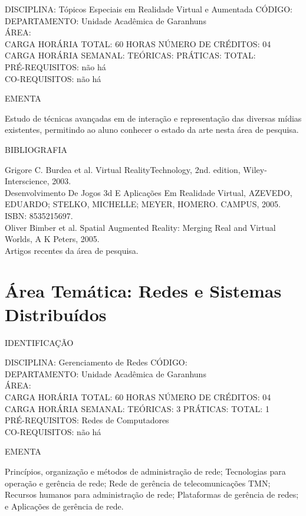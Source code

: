 \documentclass[
	12pt,				%
	openright,			%
  oneside,     %
	a4paper,			%
	english,			%
	french,				%
	spanish,			%
	brazil				%
	]{abntex2}
\begin{document}
\begin{apendicesenv}
DISCIPLINA: Tópicos Especiais em Realidade Virtual e Aumentada CÓDIGO:\\ 
DEPARTAMENTO: Unidade Acadêmica de Garanhuns\\
ÁREA: \\
CARGA HORÁRIA TOTAL: 60 HORAS NÚMERO DE CRÉDITOS: 04\\
CARGA HORÁRIA SEMANAL: TEÓRICAS: PRÁTICAS: TOTAL: \\
PRÉ-REQUISITOS: não há\\
CO-REQUISITOS: não há

EMENTA 

Estudo de técnicas avançadas em de interação e representação das
diversas mídias existentes, permitindo ao aluno conhecer o estado da
arte nesta área de pesquisa.

BIBLIOGRAFIA 

Grigore C. Burdea et al. Virtual RealityTechnology, 2nd. edition,
Wiley-Interscience, 2003.\\
Desenvolvimento De Jogos 3d E Aplicações Em Realidade Virtual, AZEVEDO,
EDUARDO; STELKO, MICHELLE; MEYER, HOMERO. CAMPUS, 2005. ISBN:
8535215697.\\
Oliver Bimber et al. Spatial Augmented Reality: Merging Real and Virtual
Worlds, A K Peters, 2005.\\
Artigos recentes da área de pesquisa.

\section*{Área Temática: Redes e Sistemas Distribuídos}

\newpage IDENTIFICAÇÃO

DISCIPLINA: Gerenciamento de Redes CÓDIGO:\\ 
DEPARTAMENTO: Unidade Acadêmica de Garanhuns\\
ÁREA: \\
CARGA HORÁRIA TOTAL: 60 HORAS NÚMERO DE CRÉDITOS: 04\\
CARGA HORÁRIA SEMANAL: TEÓRICAS: 3 PRÁTICAS: TOTAL: 1 \\
PRÉ-REQUISITOS: Redes de Computadores\\
CO-REQUISITOS: não há

EMENTA 

Princípios, organização e métodos de administração de rede; Tecnologias
para operação e gerência de rede; Rede de gerência de telecomunicações
TMN; Recursos humanos para administração de rede; Plataformas de
gerência de redes; e Aplicações de gerência de rede.


\end{apendicesenv}
\end{document}
